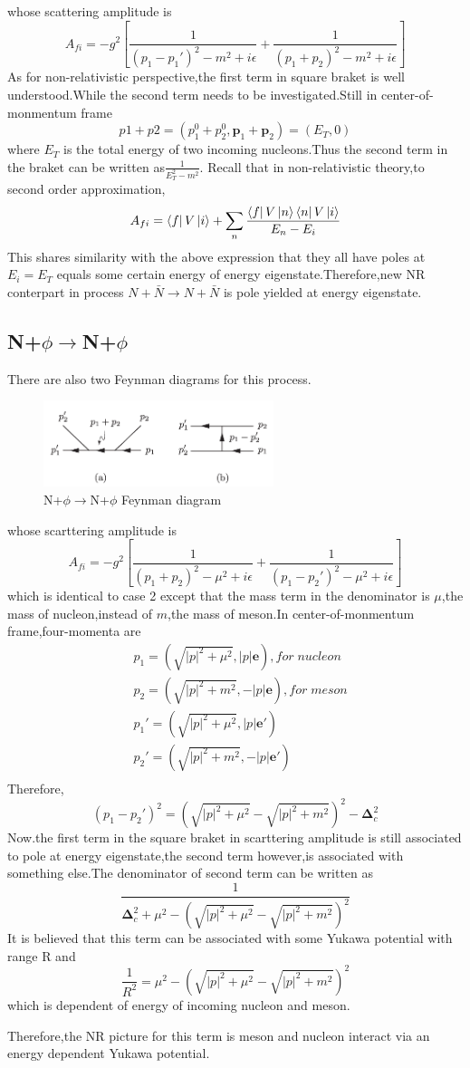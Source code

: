 \documentclass[a4paper]{article}
\begin{document}
whose scattering amplitude is$$A_{fi}=-g^2[\frac{1}{(p_1-p_1')^2-m^2+i\epsilon}+\frac{1}{(p_1+p_2)^2-m^2+i\epsilon}]$$
As for non-relativistic perspective,the first term in square braket is well understood.While the second term needs to be investigated.Still in center-of-monmentum frame$$p1+p2=(p_1^0+p_2^0,\bm{p}_1+\bm{p}_2)=(E_T,0)$$where $E_T$ is the total energy of two incoming nucleons.Thus the second term in the braket can be written as$\frac{1}{E_T^2-m^2}$.
Recall that in non-relativistic theory,to second order approximation,$$A_{fi}=\bra{f}V\ket{i}+\sum_n\frac{\bra{f}V\ket{n}\bra{n}V\ket{i}}{E_n-E_i}$$This shares similarity with the above expression that they all have poles at $E_i=E_T$ equals some certain energy of energy eigenstate.Therefore,new NR conterpart in process $N+\bar{N}\rightarrow N+\bar{N}$ is pole yielded at energy eigenstate.
\subsection{N+$\phi\rightarrow$N+$\phi$}
There are also two Feynman diagrams for this process.
\begin{figure}[thbp]
	\centering
	\includegraphics[width=0.6\textwidth]{10.png}
	\caption{N+$\phi\rightarrow$N+$\phi$ Feynman diagram}
\end{figure}

whose scarttering amplitude is$$A_{fi}=-g^2[\frac{1}{(p_1+p_2)^2-\mu^2+i\epsilon}+\frac{1}{(p_1-p_2')^2-\mu^2+i\epsilon}]$$
which is identical to case 2 except that the mass term in the denominator is $\mu$,the mass of nucleon,instead of $m$,the mass of meson.In center-of-monmentum frame,four-momenta are
\begin{align*}
	&p_1=(\sqrt{|p|^2+\mu^2},|p|\bm{e}),for\;nucleon\\
	&p_2=(\sqrt{|p|^2+m^2},-|p|\bm{e}),for\;meson\\
	&p_1'=(\sqrt{|p|^2+\mu^2},|p|\bm{e}')\\
	&p_2'=(\sqrt{|p|^2+m^2},-|p|\bm{e}')\\
\end{align*}
Therefore,
$$(p_1-p_2')^2=(\sqrt{|p|^2+\mu^2}-\sqrt{|p|^2+m^2})^2-\bm{\Delta}_c^2$$
Now.the first term in the square braket in scarttering amplitude is still associated to pole at energy eigenstate,the second term however,is associated with something else.The denominator of second term can be written as $$\frac{1}{\bm{\Delta}^2_c+\mu^2-(\sqrt{|p|^2+\mu^2}-\sqrt{|p|^2+m^2})^2}$$
It is believed that this term can be associated with some Yukawa potential with range R and $$\frac{1}{R^2}=\mu^2-(\sqrt{|p|^2+\mu^2}-\sqrt{|p|^2+m^2})^2$$which is dependent of energy of incoming nucleon and meson.
\par Therefore,the NR picture for this term is meson and nucleon interact via an energy dependent Yukawa potential.
\end{document}
